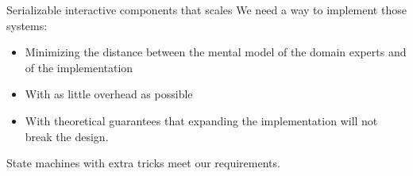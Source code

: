 \documentclass[aspectratio=169,11pt]{beamer}
\begin{document}
\begin{frame}{Serializable interactive components that scales}
    We need a way to implement those systems:
    \begin{itemize}
        \item Minimizing the distance between the mental model of the domain experts and of the implementation 
        \item With as little overhead as possible
        \item With theoretical guarantees that expanding the implementation will not break the design.
    \end{itemize}
    
    State machines with extra tricks meet our requirements. 
\end{frame}

\end{document}

